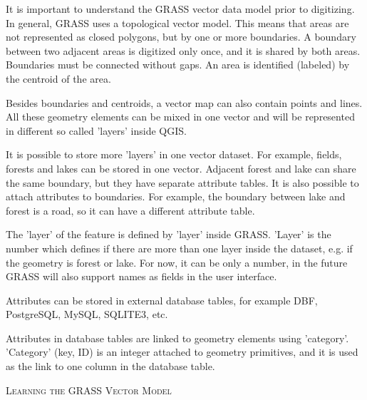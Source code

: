 It is important to understand the GRASS vector data model prior to
digitizing. In general, GRASS uses a topological
vector model. This means that areas are not represented
as closed polygons, but by one or more boundaries. A boundary between two
adjacent areas is digitized only once, and it is shared by both areas.
Boundaries must be connected without gaps. An area is identified (labeled) by
the centroid of the area.

Besides boundaries and centroids, a vector map can also contain
points and lines. All these geometry elements can be mixed
in one vector and will be represented in different so called 'layers' inside
QGIS.

It is possible to store more 'layers' in one vector dataset. For example,
fields, forests and lakes can be stored in one vector. Adjacent
forest and lake can share the same boundary, but they have separate attribute
tables. It is also possible to attach attributes to boundaries. For example,
the boundary between lake and forest is a road, so it can have a different 
attribute table.
 

The 'layer' of the feature is defined by 'layer' inside GRASS.
'Layer' is the number which defines if there are more than one layer inside the 
dataset, e.g. if the geometry is forest or lake.
For now, it can be only a number, in the future GRASS will also support  
names as fields in the user interface.

Attributes can be stored in external database tables, for example
DBF, PostgreSQL, MySQL, SQLITE3, etc.

Attributes in database tables are linked to geometry elements using
'category'. 'Category' (key, ID) is an
integer attached to geometry primitives, and it is used as the link to one
column in the database table.

\begin{Tip}\caption{\textsc{Learning the GRASS Vector Model}}
\end{Tip} 

